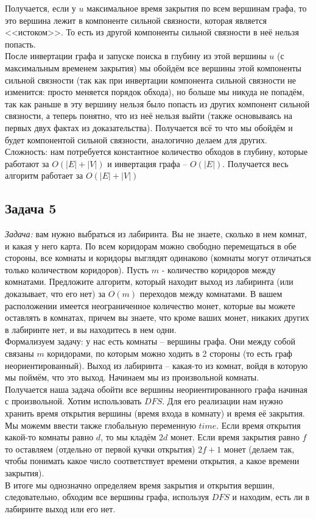 \documentclass[a4paper,12pt]{article} %
\begin{document}
Получается, если у $ u $ максимальное время закрытия по всем вершинам графа, то это вершина лежит в компоненте сильной связности, которая является <<истоком>>. То есть из другой компоненты сильной связности в неё нельзя попасть.\\

После инвертации графа и запуске поиска в глубину из этой вершины $ u $ (с максимальным временем закрытия) мы обойдём все вершины этой компоненты сильной связности (так как при инвертации компонента сильной связности не изменится: просто меняется порядок обхода), но больше мы никуда не попадём, так как раньше в эту вершину нельзя было попасть из других компонент сильной связности, а теперь понятно, что из неё нельзя выйти (также основываясь на первых двух фактах из доказательства). Получается всё то что мы обойдём и будет компонентой сильной связности, аналогично делаем для других.\\

Сложность: нам потребуется константное количество обходов в глубину, которые работают за $ O(|E| + |V|) $ и инвертация графа -- $ O(|E|) $. Получается весь алгоритм работает за $ O(|E| +|V|) $


\subsection*{Задача 5}
\textit{Задача:} вам нужно выбраться из лабиринта. Вы не знаете, сколько в нем комнат, и какая у него карта. По всем коридорам можно свободно перемещаться в обе стороны, все комнаты и коридоры выглядят одинаково (комнаты могут отличаться только количеством коридоров). Пусть $m$ - количество коридоров между комнатами. Предложите алгоритм, который находит выход из лабиринта (или доказывает, что его нет) за $O(m)$ переходов между комнатами. В вашем расположении имеется неограниченное количество монет, которые вы можете оставлять в комнатах, причем вы знаете, что кроме ваших монет, никаких других в лабиринте нет, и вы находитесь в нем одни.\\


Формализуем задачу: у нас есть комнаты -- вершины графа. Они между собой связаны  $ m $ коридорами, по которым можно ходить в 2 стороны (то есть граф неориентированный). Выход из лабиринта -- какая-то из комнат, войдя в которую мы поймём, что это выход. Начинаем мы из произвольной комнаты.\\

Получается наша задача обойти все вершины неориентированного графа начиная с произвольной. Хотим использовать $ DFS $. Для его реализации нам нужно хранить время открытия вершины (время входа в комнату) и время её закрытия.\\
Мы можемм ввести также глобальную переменную $ time $. Если время открытия какой-то комнаты равно $ d $, то мы кладём $ 2d $ монет. Если время закрытия равно $ f $ то оставляем (отдельно от первой кучки открытия) $ 2f+1 $ монет (делаем так, чтобы понимать какое число соответствует времени открытия, а какое времени закрытия).\\
В итоге мы однозначно определяем время закрытия и открытия вершин, следовательно, обходим все вершины графа, используя $ DFS $ и находим, есть ли в лабиринте выход или его нет.\\
\end{document}
